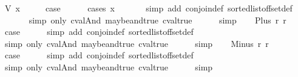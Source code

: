 \begin{isabellebody}
\ {\isacharparenleft}V\ x{\isacharparenright}\isanewline
\ \ \isamarkupfalse%
\ \isamarkupfalse%
\ {\isacharquery}case\isanewline
\ \ \ \ \isamarkupfalse%
\ {\isacharparenleft}cases\ x{\isacharparenright}\isanewline
\ \ \ \ \ \isamarkupfalse%
\ {\isacharparenleft}simp\ add{\isacharcolon}\ conjoin{\isacharunderscore}def\ sorted{\isacharunderscore}list{\isacharunderscore}of{\isacharunderscore}fset{\isacharunderscore}def{\isacharparenright}\isanewline
\ \ \ \ \ \isamarkupfalse%
\ {\isacharparenleft}simp\ only{\isacharcolon}\ cval{\isacharunderscore}And\ maybe{\isacharunderscore}and{\isacharunderscore}true\ cval{\isacharunderscore}true{\isacharparenright}\isanewline
\ \ \ \ \isamarkupfalse%
\ simp\isanewline
{}\isamarkupfalse%
\isanewline
\ \ \isamarkupfalse%
\ {\isacharparenleft}Plus\ r{}\ r{}{\isacharparenright}\isanewline
\ \ \isamarkupfalse%
\ \isamarkupfalse%
\ {\isacharquery}case\isanewline
\ \ \ \ \isamarkupfalse%
\ {\isacharparenleft}simp\ add{\isacharcolon}\ conjoin{\isacharunderscore}def\ sorted{\isacharunderscore}list{\isacharunderscore}of{\isacharunderscore}fset{\isacharunderscore}def{\isacharparenright}\isanewline
\ \ \ \ \isamarkupfalse%
\ {\isacharparenleft}simp\ only{\isacharcolon}\ cval{\isacharunderscore}And\ maybe{\isacharunderscore}and{\isacharunderscore}true\ cval{\isacharunderscore}true{\isacharparenright}\isanewline
\ \ \ \ \isamarkupfalse%
\ simp\isanewline
{}\isamarkupfalse%
\isanewline
\ \ \isamarkupfalse%
\ {\isacharparenleft}Minus\ r{}\ r{}{\isacharparenright}\isanewline
\ \ \isamarkupfalse%
\ \isamarkupfalse%
\ {\isacharquery}case\isanewline
\ \ \ \ \isamarkupfalse%
\ {\isacharparenleft}simp\ add{\isacharcolon}\ conjoin{\isacharunderscore}def\ sorted{\isacharunderscore}list{\isacharunderscore}of{\isacharunderscore}fset{\isacharunderscore}def{\isacharparenright}\isanewline
\ \ \ \ \isamarkupfalse%
\ {\isacharparenleft}simp\ only{\isacharcolon}\ cval{\isacharunderscore}And\ maybe{\isacharunderscore}and{\isacharunderscore}true\ cval{\isacharunderscore}true{\isacharparenright}\isanewline
\ \ \ \ \isamarkupfalse%
\ simp\isanewline
{}\isamarkupfalse%
%
\endisatagproof
{\isafoldproof}%
%
\isadelimproof
\isanewline
%
\endisadelimproof
\isanewline

\end{isabellebody}

